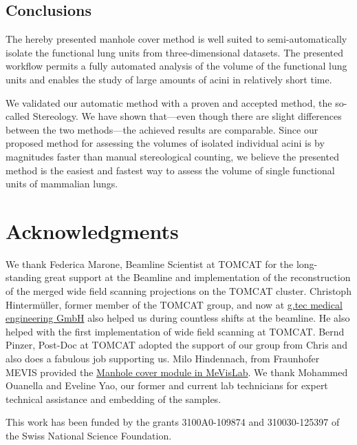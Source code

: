 \documentclass[%
	paper=a4,%
	abstract=true,%
	]{scrartcl}
\begin{document}
\subsection{Conclusions}
The hereby presented manhole cover method is well suited to semi-automatically isolate the functional lung units from three-dimensional datasets. The presented workflow permits a fully automated analysis of the volume of the functional lung units and enables the study of large amounts of acini in relatively short time.

We validated our automatic method with a proven and accepted method, the so-called Stereology. We have shown that---even though there are slight differences between the two methods---the achieved results are comparable. Since our proposed method for assessing the volumes of isolated individual acini is by magnitudes faster than manual stereological counting, we believe the presented method is the easiest and fastest way to assess the volume of single functional units of mammalian lungs.

\clearpage
\section{Acknowledgments}
We thank Federica Marone, Beamline Scientist at TOMCAT for the long-standing great support at the Beamline and implementation of the reconstruction of the merged wide field scanning projections on the TOMCAT cluster. Christoph Hinterm\"{u}ller, former member of the TOMCAT group, and now at \href{http://gtec.at/}{g.tec medical engineering GmbH} also helped us during countless shifts at the beamline. He also helped with the first implementation of wide field scanning at TOMCAT. Bernd Pinzer, Post-Doc at TOMCAT adopted the support of our group from Chris and also does a fabulous job supporting us. Milo Hindennach, from Fraunhofer MEVIS provided the \href{http://www.mevis-research.de/cgi-bin/discus/board-auth.cgi?lm=1282233250&file=/839/11760.html}{Manhole cover module in MeVisLab}. We thank Mohammed Ouanella and Eveline Yao, our former and current lab technicians for expert technical assistance and embedding of the samples.

This work has been funded by the grants 3100A0-109874 and 310030-125397 of the Swiss National Science Foundation.

\clearpage
\singlespacing


\end{document}
